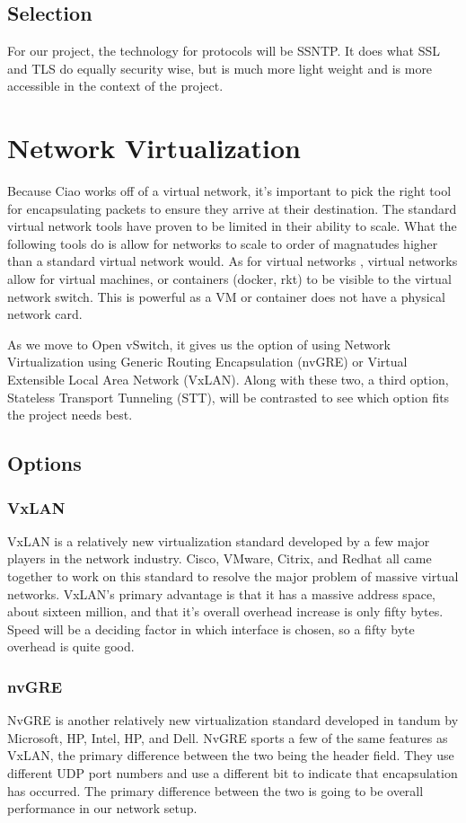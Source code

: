 \documentclass[10pt,letterpaper,onecolumn,draftclsnofoot]{IEEEtran}
\begin{document}
\subsection{Selection}
For our project, the technology for protocols will be SSNTP. It does what SSL
and TLS do equally security wise, but is much more light weight and is more
accessible in the context of the project.


\section{Network Virtualization}
Because Ciao works off of a virtual network, it's important to pick the right
tool for encapsulating packets to ensure they arrive at their destination. The
standard virtual network tools have proven to be limited in their ability to
scale. What the following tools do is allow for networks to scale to order of
magnatudes higher than a standard virtual network would. As for virtual networks
, virtual networks allow for virtual machines, or containers (docker, rkt) to be
visible to the virtual network switch. This is powerful as a VM or container
does not have a physical network card.

As we move to Open vSwitch, it gives us the option of using Network
Virtualization using Generic Routing Encapsulation (nvGRE) or Virtual Extensible
Local Area Network (VxLAN). Along with these two, a third option, Stateless
Transport Tunneling (STT), will be contrasted to see which option fits the
project needs best.

\subsection{Options}
\subsubsection{VxLAN}
VxLAN is a relatively new virtualization standard developed by a few major
players in the network industry. Cisco, VMware, Citrix, and Redhat all came
together to work on this standard to resolve the major problem of massive
virtual networks. VxLAN's primary advantage is that it has a massive address
space, about sixteen million, and that it's overall overhead increase is only
fifty bytes. \cite{vxlan} Speed will be a deciding factor in which interface
is chosen, so a fifty byte overhead is quite good.

\subsubsection{nvGRE}
NvGRE is another relatively new virtualization standard developed in tandum by
Microsoft, HP, Intel, HP, and Dell.\cite{nvgre-info} NvGRE sports a few of the
same features as VxLAN, the primary difference between the two being the header
field. They use different UDP port numbers and use a different bit to indicate
that encapsulation has occurred.\cite{nvgre} The primary difference between the
two is going to be overall performance in our network setup.
\end{document}
